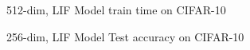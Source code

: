 \newcommand{\plotxscale}{\largeplotxscale}
\newcommand{\plotyscale}{\largeplotyscale}

%  

%  

\begin{figure}[t]
  \centering
  
  \caption{512-dim, LIF Model train time on CIFAR-10}
  \label{fig:lif_512_train_time}
\end{figure}

%  

\begin{figure}[t]
  \centering
  
  \caption{256-dim, LIF Model Test accuracy on CIFAR-10}
  \label{fig:lif_256_acc1_test}
\end{figure}

%  

%  

%  






\renewcommand{\plotxscale}{\smallplotxscale}
\renewcommand{\plotyscale}{\smallplotyscale}